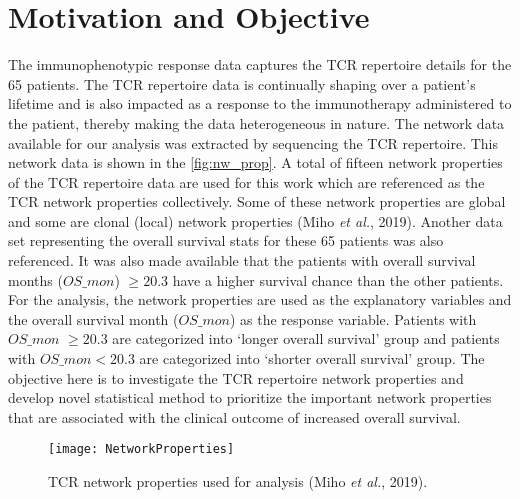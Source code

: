 \section{Motivation and Objective}\label{sec:motiv_objctv}
The immunophenotypic response data captures the TCR repertoire details for the 65 patients. The TCR repertoire data is continually shaping over a patient's lifetime and is also impacted as a response to the immunotherapy administered to the patient, thereby making the data heterogeneous in nature. The network data available for our analysis was extracted by sequencing the TCR repertoire. This network data is shown in the \autoref{fig:nw_prop}. A total of fifteen network properties of the TCR repertoire data are used for this work which are referenced as the TCR network properties collectively. Some of these network properties are global and some are clonal (local) network properties (\cite{tcr_ntw}Miho \textit{et al.}, 2019). Another data set representing the overall survival stats for these 65 patients was also referenced. It was also made available that the patients with overall survival months ($OS\_mon$) $\ge 20.3$ have a higher survival chance than the other patients. For the analysis, the network properties are used as the explanatory variables and the overall survival month ($OS\_mon$) as the response variable. Patients with $OS\_mon$ $\ge 20.3$ are categorized into \lq longer overall survival' group and patients with $OS\_mon<20.3$ are categorized into \lq shorter overall survival' group. The objective here is to investigate the TCR repertoire network properties and develop novel statistical method to prioritize the important network properties that are associated with the clinical outcome of increased overall survival.\par
\begin{figure}[H]
\centering
\texttt{[image: NetworkProperties]}
\caption{TCR network properties used for analysis (\cite{tcr_ntw}Miho \textit{et al.}, 2019).}
\label{fig:nw_prop}
\end{figure}

